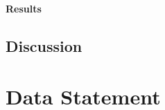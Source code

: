\documentclass[a4]{article}
\begin{document}








\paragraph{Results} 





\subsection{Discussion} %


\section{Data Statement}





\appendix

\end{document}
